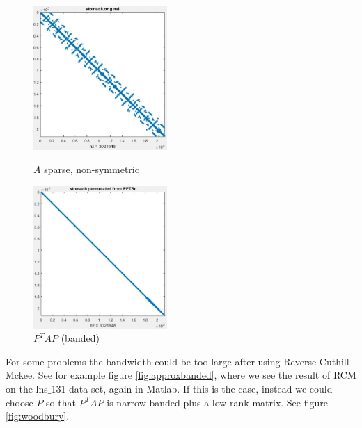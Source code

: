 \documentclass[a4paper,12pt]{article}
\begin{document}
\begin{figure}[ht]
\centering
\begin{minipage}[b]{0.45\linewidth}
\includegraphics[width=2in]{Images/SparseA_v5.jpg}
\caption{$A$ sparse, non-symmetric}
\label{fig:v5}
\end{minipage}
\quad
\begin{minipage}[b]{0.45\linewidth}
\includegraphics[width=2in]{Images/Arcm_v3.jpg}
\caption{$P^TAP$ (banded)}
\label{fig:v3}
\end{minipage}
\end{figure}

For some problems the bandwidth could be too large after using Reverse Cuthill Mckee. See for example figure \ref{fig:approxbanded}, where we see the result of RCM on the lns$\_$131 data set, again in Matlab.  If this is the case, instead we could choose $P$ so that $P^TAP$ is narrow banded plus a low rank matrix. See figure \ref{fig:woodbury}. 
\end{document}
